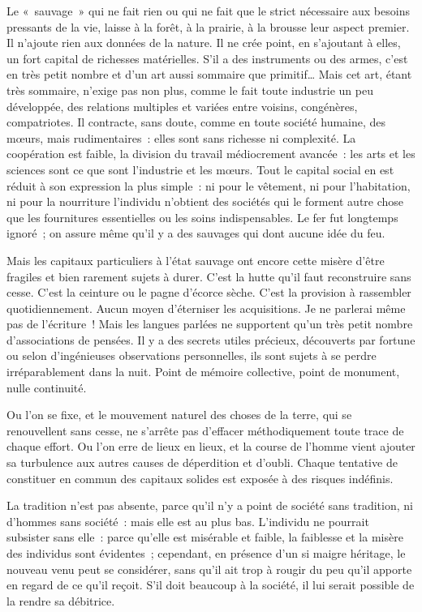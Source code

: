 \documentclass[french,twoside]{book} %
\newcommand{\astermono}{\medskip\centerline{\color{rubric}\large\selectfont{\syms ✻}}\medskip\par}%
\begin{document}
Le « sauvage » qui ne fait rien ou qui ne fait que le strict nécessaire aux besoins pressants de la vie, laisse à la forêt, à la prairie, à la brousse leur aspect premier. Il n’ajoute rien aux données de la nature. Il ne crée point, en s’ajoutant à elles, un fort capital de richesses matérielles. S’il a des instruments ou des armes, c’est en très petit nombre et d’un art aussi sommaire que primitif… Mais cet art, étant très sommaire, n’exige pas non plus, comme le fait toute industrie un peu développée, des relations multiples et variées entre voisins, congénères, compatriotes. Il contracte, sans doute, comme en toute société humaine, des mœurs, mais rudimentaires : elles sont sans richesse ni complexité. La coopération est faible, la division du travail médiocrement avancée : les arts et les sciences sont ce que sont l’industrie et les mœurs. Tout le capital social en est réduit à son expression la plus simple : ni pour le vêtement, ni pour l’habitation, ni pour la nourriture l’individu n’obtient des sociétés qui le forment autre chose que les fournitures essentielles ou les soins indispensables. Le fer fut longtemps ignoré ; on assure même qu’il y a des sauvages qui dont aucune idée du feu.\par

\astermono

\noindent Mais les capitaux particuliers à l’état sauvage ont encore cette misère d’être fragiles et bien rarement sujets à durer. C’est la hutte qu’il faut reconstruire sans cesse. C’est la ceinture ou le pagne d’écorce sèche. C’est la provision à rassembler quotidiennement. Aucun moyen d’éterniser les acquisitions. Je ne parlerai même pas de l’écriture ! Mais les langues parlées ne supportent qu’un très petit nombre d’associations de pensées. Il y a des secrets utiles précieux, découverts par fortune ou selon d’ingénieuses observations personnelles, ils sont sujets à se perdre irréparablement dans la nuit. Point de mémoire collective, point de monument, nulle continuité.\par
Ou l’on se fixe, et le mouvement naturel des choses de la terre, qui se renouvellent sans cesse, ne s’arrête pas d’effacer méthodiquement toute trace de chaque effort. Ou l’on erre de lieux en lieux, et la course de l’homme vient ajouter sa turbulence aux autres causes de déperdition et d’oubli. Chaque tentative de constituer en commun des capitaux solides est exposée à des risques indéfinis.\par
La tradition n’est pas absente, parce qu’il n’y a point de société sans tradition, ni d’hommes sans société : mais elle est au plus bas. L’individu ne pourrait subsister sans elle : parce qu’elle est misérable et faible, la faiblesse et la misère des individus sont évidentes ; cependant, en présence d’un si maigre héritage, le nouveau venu peut se considérer, sans qu’il ait trop à rougir du peu qu’il apporte en regard de ce qu’il reçoit. S’il doit beaucoup à la société, il lui serait possible de la rendre sa débitrice.\par
\end{document}
